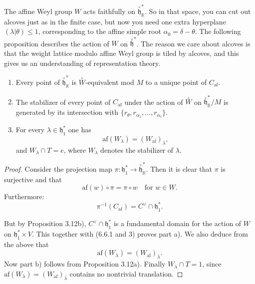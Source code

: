 \documentclass[12pt]{article}
\begin{document}
The affine Weyl group $W$ acts faithfully on $\overset{\circ}{\mathfrak{h}}^*_{\mathbb{R}}$. So in that space, you can cut out alcoves just as in the finite case, but now you need one extra hyperplane $(\lambda|\theta) \leq 1$, corresponding to the affine simple root $\alpha_0 = \delta - \theta$. The following proposition describes the action of $W$ on $\overset{\circ}{\mathfrak{h}}^*$. The reason we care about alcoves is that the weight lattice modulo affine Weyl group is tiled by alcoves, and this gives us an understanding of representation theory.
\begin{proposition}[6.6]
    \leavevmode
    \begin{enumerate}[label=\alph*)]
        \item Every point of $\overset{\circ}{\mathfrak{h}}^*_{\mathbb{R}}$ is $\overset{\circ}{W}$-equivalent mod $M$ to a unique point of $C_{\mathrm{af}}$.

        \item The stabilizer of every point of $C_{\mathrm{af}}$ under the action of $\overset{\circ}{W}$ on
              $\overset{\circ}{\mathfrak{h}}^*_{\mathbb{R}} / M$ is generated by its intersection with
              $\{r_\theta, r_{\alpha_1}, \dots, r_{\alpha_\ell}\}$.

        \item For every $\lambda \in \mathfrak{h}^*_1$ one has
              \[
                  \mathrm{af}(W_\lambda) = (W_{\mathrm{af}})_{\bar{\lambda}},
              \]
              and $W_\lambda \cap T = e$, where $W_\lambda$ denotes the stabilizer of $\lambda$.
    \end{enumerate}
\end{proposition}

\begin{proof}
    Consider the projection map
    \(\pi : \mathfrak{h}^*_1 \to \overset{\circ}{\mathfrak{h}}^*_{\mathbb{R}}\).
    Then it is clear that $\pi$ is surjective and that
    \[
        \mathrm{af}(w) \circ \pi = \pi \circ w \quad \text{for } w \in W.
    \]
    Furthermore:
    \[
        \pi^{-1}(C_{\mathrm{af}}) = C^\vee \cap \mathfrak{h}^*_1.
    \]

    But by Proposition 3.12b), $C^\vee \cap \mathfrak{h}^*_1$ is a fundamental domain for the action of $W$ on $\mathfrak{h}^*_1 \times V$. This together with (6.6.1 and 3) proves part a). We also deduce from the above that
    \[
        \mathrm{af}(W_\lambda) = (W_{\mathrm{af}})_{\bar{\lambda}}.
    \]
    Now part b) follows from Proposition 3.12a). Finally $W_\lambda \cap T = 1$, since $\mathrm{af}(W_\lambda) = (W_{\mathrm{af}})_{\bar{\lambda}}$ contains no nontrivial translation.
\end{proof}
\end{document}
